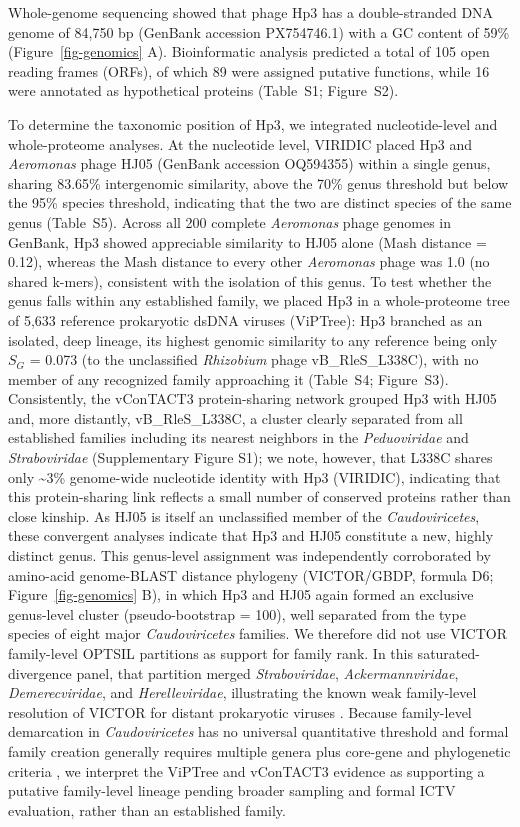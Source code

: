 \documentclass[11pt,a4paper]{article}
\begin{document}
Whole-genome sequencing showed that phage Hp3 has a
double-stranded DNA genome of 84,750 bp (GenBank accession PX754746.1)
with a GC content of 59\% (Figure~\ref{fig-genomics} A). Bioinformatic analysis predicted a total
of 105 open reading frames (ORFs), of which 89 were assigned putative
functions, while 16 were annotated as hypothetical proteins
(Table~S1; Figure~S2).

To determine the taxonomic position of Hp3, we integrated
nucleotide-level and whole-proteome analyses. At the
nucleotide level, VIRIDIC placed Hp3 and \emph{Aeromonas} phage HJ05
(GenBank accession OQ594355) within a single genus, sharing 83.65\%
intergenomic similarity, above the 70\% genus threshold but below the
95\% species threshold, indicating that the two are distinct species of
the same genus (Table~S5). Across all 200 complete
\emph{Aeromonas} phage genomes in GenBank, Hp3 showed appreciable
similarity to HJ05 alone (Mash distance = 0.12), whereas the Mash
distance to every other \emph{Aeromonas} phage was 1.0 (no shared
k-mers), consistent with the isolation of this genus. To test whether the
genus falls within any established family, we placed Hp3 in a
whole-proteome tree of 5,633 reference prokaryotic dsDNA viruses
(ViPTree): Hp3 branched as an isolated, deep lineage, its highest
genomic similarity to any reference being only \(S_G\) = 0.073 (to the
unclassified \emph{Rhizobium} phage vB\_RleS\_L338C), with no member of
any recognized family approaching it (\mbox{Table~S4}; Figure~S3). Consistently, the vConTACT3
protein-sharing network grouped Hp3 with HJ05 and, more distantly,
vB\_RleS\_L338C, a cluster clearly separated from all established
families including its nearest neighbors in the \emph{Peduoviridae} and
\emph{Straboviridae} (Supplementary Figure S1); we note, however,
that L338C shares only \textasciitilde3\% genome-wide nucleotide
identity with Hp3 (VIRIDIC), indicating that this protein-sharing link
reflects a small number of conserved proteins rather than close kinship.
As HJ05 is itself an unclassified member of the \emph{Caudoviricetes},
these convergent analyses indicate that Hp3 and HJ05 constitute a new,
highly distinct genus. This genus-level assignment was independently
corroborated by amino-acid genome-BLAST distance phylogeny
(VICTOR/GBDP, formula D6; Figure~\ref{fig-genomics} B), in which Hp3 and HJ05 again formed an
exclusive genus-level cluster (pseudo-bootstrap = 100), well separated
from the type species of eight major \emph{Caudoviricetes} families. We
therefore did not use VICTOR family-level OPTSIL partitions as support
for family rank. In this saturated-divergence panel, that partition
merged \emph{Straboviridae}, \emph{Ackermannviridae},
\emph{Demerecviridae}, and \emph{Herelleviridae}, illustrating the
known weak family-level resolution of VICTOR for distant prokaryotic
viruses \citep{2017-VICTOR_Meier-Kolthoff}. Because family-level
demarcation in \emph{Caudoviricetes} has no universal quantitative
threshold and formal family creation generally requires multiple genera
plus core-gene and phylogenetic criteria
\citep{2021-Roadmap_Turner,2023-Abolishment_Turner}, we interpret the
ViPTree and vConTACT3 evidence as supporting a putative
family-level lineage pending broader sampling and formal ICTV
evaluation, rather than an established family.
\end{document}
